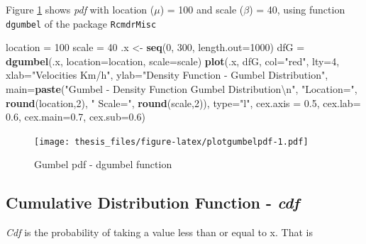 \documentclass[12pt,oneside]{reedthesis}
\newenvironment{Shaded}{\begin{snugshade}}{\end{snugshade}}
\newcommand{\CharTok}[1]{\textcolor[rgb]{0.31,0.60,0.02}{#1}}
\newcommand{\DataTypeTok}[1]{\textcolor[rgb]{0.13,0.29,0.53}{#1}}
\newcommand{\DecValTok}[1]{\textcolor[rgb]{0.00,0.00,0.81}{#1}}
\newcommand{\FloatTok}[1]{\textcolor[rgb]{0.00,0.00,0.81}{#1}}
\newcommand{\KeywordTok}[1]{\textcolor[rgb]{0.13,0.29,0.53}{\textbf{#1}}}
\newcommand{\NormalTok}[1]{#1}
\newcommand{\StringTok}[1]{\textcolor[rgb]{0.31,0.60,0.02}{#1}}
\begin{document}
Figure \ref{fig:plotgumbelpdf} shows \emph{pdf} with location (\(\mu\)) = 100 and scale (\(\beta\)) = 40, using function \texttt{dgumbel} of the package \texttt{RcmdrMisc}

\footnotesize
\begin{Shaded}
\begin{Highlighting}[]
\NormalTok{location =}\StringTok{ }\DecValTok{100}
\NormalTok{scale =}\StringTok{ }\DecValTok{40}
\NormalTok{.x <-}\StringTok{ }\KeywordTok{seq}\NormalTok{(}\DecValTok{0}\NormalTok{, }\DecValTok{300}\NormalTok{, }\DataTypeTok{length.out=}\DecValTok{1000}\NormalTok{)}
\NormalTok{dfG =}\StringTok{ }\KeywordTok{dgumbel}\NormalTok{(.x, }\DataTypeTok{location=}\NormalTok{location, }\DataTypeTok{scale=}\NormalTok{scale)}
\KeywordTok{plot}\NormalTok{(.x, dfG, }\DataTypeTok{col=}\StringTok{"red"}\NormalTok{, }\DataTypeTok{lty=}\DecValTok{4}\NormalTok{, }
     \DataTypeTok{xlab=}\StringTok{"Velocities Km/h"}\NormalTok{, }\DataTypeTok{ylab=}\StringTok{"Density Function - Gumbel Distribution"}\NormalTok{, }
     \DataTypeTok{main=}\KeywordTok{paste}\NormalTok{(}\StringTok{"Gumbel - Density Function Gumbel Distribution}\CharTok{\textbackslash{}n}\StringTok{"}\NormalTok{, }\StringTok{"Location="}\NormalTok{, }
     \KeywordTok{round}\NormalTok{(location,}\DecValTok{2}\NormalTok{), }\StringTok{" Scale="}\NormalTok{, }\KeywordTok{round}\NormalTok{(scale,}\DecValTok{2}\NormalTok{)), }\DataTypeTok{type=}\StringTok{"l"}\NormalTok{, }
     \DataTypeTok{cex.axis =} \FloatTok{0.5}\NormalTok{, }\DataTypeTok{cex.lab=} \FloatTok{0.6}\NormalTok{, }\DataTypeTok{cex.main=}\FloatTok{0.7}\NormalTok{, }\DataTypeTok{cex.sub=}\FloatTok{0.6}\NormalTok{)}
\end{Highlighting}
\end{Shaded}
\begin{figure}
\centering
\texttt{[image: thesis\_files/figure-latex/plotgumbelpdf-1.pdf]}
\caption{\label{fig:plotgumbelpdf}Gumbel pdf - dgumbel function}
\end{figure}
\normalsize

\hypertarget{cumulative-distribution-function---cdf}{%
\subsection{\texorpdfstring{Cumulative Distribution Function - \emph{cdf}}{Cumulative Distribution Function - cdf}}\label{cumulative-distribution-function---cdf}}

\emph{Cdf} is the probability of taking a value less than or equal to x. That is
\end{document}
